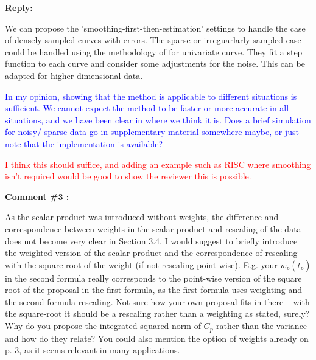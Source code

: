 \documentclass[11pt]{article}
\begin{document}
\medskip

\normalfont

\textbf{Reply:}

We can propose the 'smoothing-first-then-estimation' settings to handle the  case of densely sampled curves with errors. The sparse or irreguarlarly sampled case could be handled using the methodology of \cite{benkoCommonFunctionalPrincipal2009} for univariate curve. They fit a step function to each curve and consider some adjustments for the noise. This can be adapted for higher dimensional data.

\textcolor{blue}{In my opinion, showing that the method is applicable to different situations is sufficient. We cannot expect the method to be faster or more accurate in all situations, and we have been clear in where we think it is. Does a brief simulation for noisy/ sparse data go in supplementary material somewhere maybe, or just note that the implementation is available?}

\textcolor{red}{I think this should suffice, and adding an example such as RISC where smoothing isn't required would be good to show the reviewer this is possible.}

\bigskip

\itshape


\textbf{Comment \#3 :}

As the scalar product was introduced without weights, the difference and correspondence between weights in the scalar product and rescaling of the data does not become very clear in Section 3.4. I would suggest to briefly introduce the weighted version of the scalar product and the correspondence of rescaling with the square-root of the weight (if not rescaling point-wise). E.g. your $w_p(t_p)$ in the second formula really corresponds to the point-wise version of the square root of the proposal in the first formula, as the first formula uses weighting and the second formula rescaling. Not sure how your own proposal fits in there – with the square-root it should be a rescaling rather than a weighting as stated, surely? Why do you propose the integrated squared norm of $C_p$ rather than the variance and how do they relate? You could also mention the option of weights already on p. 3, as it seems relevant in many applications.
\end{document}

